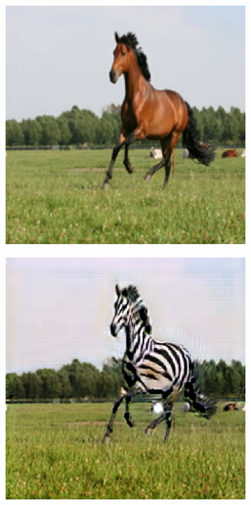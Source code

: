 \begin{figure}
\begin{subfigure}[t]{.14\textwidth}
  \end{subfigure}
  \hfill
  \begin{subfigure}[t]{.14\textwidth}
    \centering
    \includegraphics[width=\linewidth]{images/cycleGanResults/horse_input2.png}
  \end{subfigure}
  \begin{subfigure}[t]{.14\textwidth}
    \centering
    \includegraphics[width=\linewidth]{images/cycleGanResults/horse_output2.png}
  \end{subfigure}


\end{figure}
